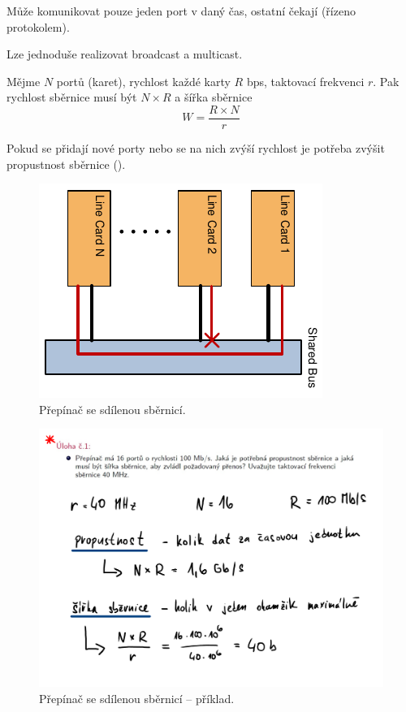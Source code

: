 \begin{compactitem}
    \item Může komunikovat pouze jeden port v daný čas, ostatní čekají (řízeno protokolem).
    \item Lze jednoduše realizovat broadcast a multicast.
    \item Mějme $N$ portů (karet), rychlost každé karty $R$ bps, taktovací frekvenci $r$. Pak rychlost sběrnice musí být $N \times R$ a šířka sběrnice $$W = \frac{R \times N}{r}$$
    \item Pokud se přidají nové porty nebo se na nich zvýší rychlost je potřeba zvýšit propustnost sběrnice ().
\end{compactitem}

\begin{figure}[H]
    \centering
    \includegraphics[width=0.5\linewidth]{sdilena_deska_sdilena_sbernice.pdf}
    \caption{Přepínač se sdílenou sběrnicí.}
\end{figure}

\begin{figure}[H]
    \centering
    \includegraphics[width=1\linewidth]{sdilena_deska_sdilena_sbernice_priklad.pdf}
    \caption{Přepínač se sdílenou sběrnicí -- příklad.}
\end{figure}

